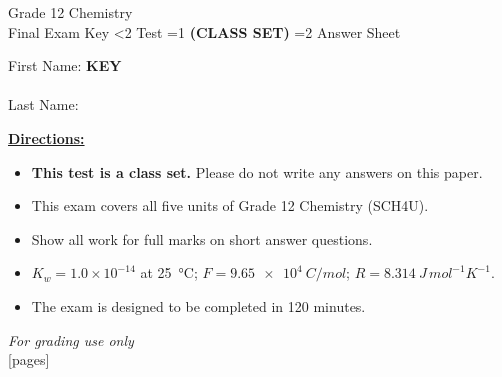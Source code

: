 \documentclass[addpoints]{exam}
\newcommand{\event}{Final Exam}
\newcommand{\tournament}{}  %
\def\type{0}
\begin{document}
\begin{center}
    {\huge Grade 12 Chemistry \\ \event
    \ifprintanswers
     \space Key
    \else
     \space \ifnum\type<2 Test \fi \ifnum\type=1 \textbf{(CLASS SET)} \fi \ifnum\type=2 Answer Sheet \fi
    \fi \\ \vspace{3mm}\tournament\vspace{1mm}}
\end{center}

\vspace{.25\textheight}

\begin{center}
    First Name: \ifprintanswers
    \underline{\hspace{3.5cm}}\textbf{KEY}\underline{\hspace{5.5cm}}\\\vspace{5mm}
    \else
        \underline{\hspace{10cm}}\\ \vspace{5mm}
    \fi
    Last Name: \underline{\hspace{10cm}}\\ \vspace{5mm}
\end{center}

\noindent\textbf{\underline{Directions:}}
\begin{itemize}
    \ifnum\type=1 \item \textbf{This test is a class set.} Please do not write any answers on this paper. \fi
    \item This exam covers all five units of Grade 12 Chemistry (SCH4U).
    \item Show all work for full marks on short answer questions.
    \item $K_w = 1.0\times10^{-14}$ at \SI{25}{\celsius};
          $F = \SI{9.65e4}{C/mol}$;
          $R = \SI{8.314}{J\,mol^{-1}K^{-1}}$.
    \item The exam is designed to be completed in 120 minutes.
\end{itemize}
\begin{center}
\textit{For grading use only}\\
[pages]
\end{center}
\end{document}

